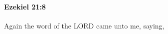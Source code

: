 
		\paragraph{Ezekiel 21:8} %
			\label{EZEKIEL-21-8}

			Again the word of the LORD came unto me, saying,


